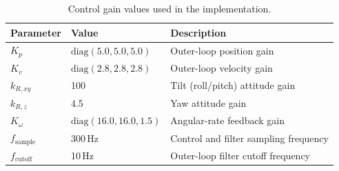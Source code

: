 \begin{table}[h!]
\centering
\caption{Control gain values used in the implementation.}
\label{tab:control-gains}
\begin{tabular}{lll}
\toprule
\textbf{Parameter} & \textbf{Value} & \textbf{Description} \\
\midrule
$K_p$ & $\mathrm{diag}(5.0, 5.0, 5.0)$ & Outer-loop position gain \\
$K_v$ & $\mathrm{diag}(2.8, 2.8, 2.8)$ & Outer-loop velocity gain \\
$k_{R,xy}$ & 100 & Tilt (roll/pitch) attitude gain \\
$k_{R,z}$ & 4.5 & Yaw attitude gain \\
$K_\omega$ & $\mathrm{diag}(16.0, 16.0, 1.5)$ & Angular-rate feedback gain \\
$f_{\mathrm{sample}}$ & 300\,Hz & Control and filter sampling frequency \\
$f_{\mathrm{cutoff}}$ & 10\,Hz & Outer-loop filter cutoff frequency \\
\bottomrule
\end{tabular}
\end{table}
